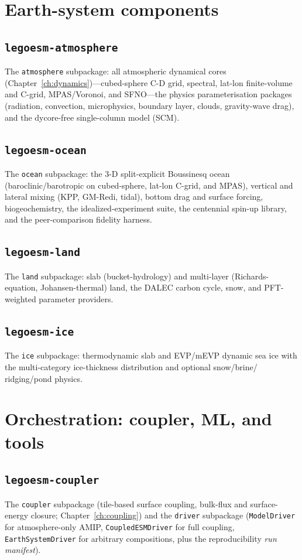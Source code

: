 \documentclass[11pt,twoside]{report}
\begin{document}
\section{Earth-system components}
\label{sec:arch-components}

\subsection{\texttt{legoesm-atmosphere}}
The \texttt{atmosphere} subpackage: all atmospheric dynamical cores
(Chapter~\ref{ch:dynamics})---cubed-sphere C-D grid, spectral, lat-lon
finite-volume and C-grid, MPAS/Voronoi, and SFNO---the physics parameterisation
packages (radiation, convection, microphysics, boundary layer, clouds,
gravity-wave drag), and the dycore-free single-column model (SCM).

\subsection{\texttt{legoesm-ocean}}
The \texttt{ocean} subpackage: the 3-D split-explicit Boussinesq ocean
(baroclinic/barotropic on cubed-sphere, lat-lon C-grid, and MPAS), vertical and
lateral mixing (KPP, GM-Redi, tidal), bottom drag and surface forcing,
biogeochemistry, the idealized-experiment suite, the centennial spin-up library,
and the peer-comparison fidelity harness.

\subsection{\texttt{legoesm-land}}
The \texttt{land} subpackage: slab (bucket-hydrology) and multi-layer
(Richards-equation, Johansen-thermal) land, the DALEC carbon cycle, snow, and
PFT-weighted parameter providers.

\subsection{\texttt{legoesm-ice}}
The \texttt{ice} subpackage: thermodynamic slab and EVP/mEVP dynamic sea ice
with the multi-category ice-thickness distribution and optional snow/brine/
ridging/pond physics.

\section{Orchestration: coupler, ML, and tools}
\label{sec:arch-orchestration}

\subsection{\texttt{legoesm-coupler}}
The \texttt{coupler} subpackage (tile-based surface coupling, bulk-flux and
surface-energy closure; Chapter~\ref{ch:coupling}) and the \texttt{driver}
subpackage (\texttt{ModelDriver} for atmosphere-only AMIP, \texttt{CoupledESMDriver}
for full coupling, \texttt{EarthSystemDriver} for arbitrary compositions, plus
the reproducibility \emph{run manifest}).
\end{document}
